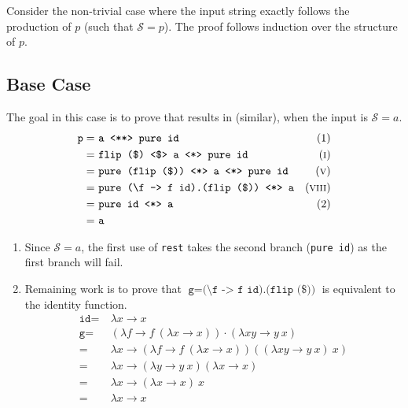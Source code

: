 Consider the non-trivial case where the input string exactly follows the production of $p$ (such that $\mathcal{S} = p$).
The proof follows induction over the structure of $p$.

\subsection{Base Case}
The goal in this case is to prove that  results in  (similar), when the input is $\mathcal{S} = a$.
\begin{align*}
    \texttt{p} =\ & \texttt{a \pa pure id} & \text{(1)} \\
    =\ & \texttt{flip (\$) \fmap a \ap pure id} & \equi[1] \\
    =\ & \texttt{pure (flip (\$)) \ap a \ap pure id} & \equi[5] \\
    =\ & \texttt{pure (\textbackslash f -> f id).(flip (\$)) \ap a} & \equi[8] \\
    =\ & \texttt{pure id \ap a} & \text{(2)} \\
    =\ & \texttt{a}
\end{align*}
\begin{enumerate}[(1)]
    \itemsep0em
    \item Since $\mathcal{S} = a$, the first use of \texttt{rest} takes the second branch (\texttt{pure id}) as the first branch will fail.
    \item Remaining work is to prove that $\texttt{g} = \texttt{(\textbackslash f -> f id).(flip (\$))}$ is equivalent to the identity function.
        \begin{align*}
            \texttt{id} =\ & \lambda x \to x \\
            \texttt{g} =\ & (\lambda f \to f\ (\lambda x \to x)) \cdot (\lambda xy \to y\ x) \\
            =\ & \lambda x \to (\lambda f \to f\ (\lambda x \to x))((\lambda xy \to y\ x)\ x) \\
            =\ & \lambda x \to (\lambda y \to y\ x)(\lambda x \to x) \\
            =\ & \lambda x \to (\lambda x \to x)\ x \\
            =\ & \lambda x \to x
        \end{align*}
\end{enumerate}

